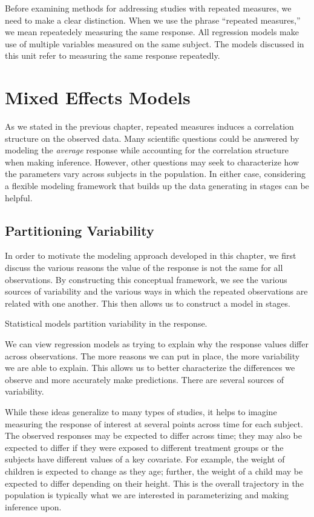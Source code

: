 \documentclass[
]{book}
\theoremstyle{plain}
\theoremstyle{mydefn}
\theoremstyle{myexmpl}
\theoremstyle{remark}
\begin{document}
Before examining methods for addressing studies with repeated measures, we need to make a clear distinction. When we use the phrase ``repeated measures,'' we mean repeatedely measuring the same response. All regression models make use of multiple variables measured on the same subject. The models discussed in this unit refer to measuring the same response repeatedly.

\hypertarget{rm-mixed-models}{%
\chapter{Mixed Effects Models}\label{rm-mixed-models}}

As we stated in the previous chapter, repeated measures induces a correlation structure on the observed data. Many scientific questions could be answered by modeling the \emph{average} response while accounting for the correlation structure when making inference. However, other questions may seek to characterize how the parameters vary across subjects in the population. In either case, considering a flexible modeling framework that builds up the data generating in stages can be helpful.

\hypertarget{partitioning-variability}{%
\section{Partitioning Variability}\label{partitioning-variability}}

In order to motivate the modeling approach developed in this chapter, we first discuss the various reasons the value of the response is not the same for all observations. By constructing this conceptual framework, we see the various sources of variability and the various ways in which the repeated observations are related with one another. This then allows us to construct a model in stages.

\begin{rmdkeyidea}
Statistical models partition variability in the response.
\end{rmdkeyidea}

We can view regression models as trying to explain why the response values differ across observations. The more reasons we can put in place, the more variability we are able to explain. This allows us to better characterize the differences we observe and more accurately make predictions. There are several sources of variability.

While these ideas generalize to many types of studies, it helps to imagine measuring the response of interest at several points across time for each subject. The observed responses may be expected to differ across time; they may also be expected to differ if they were exposed to different treatment groups or the subjects have different values of a key covariate. For example, the weight of children is expected to change as they age; further, the weight of a child may be expected to differ depending on their height. This is the overall trajectory in the population is typically what we are interested in parameterizing and making inference upon.
\end{document}
